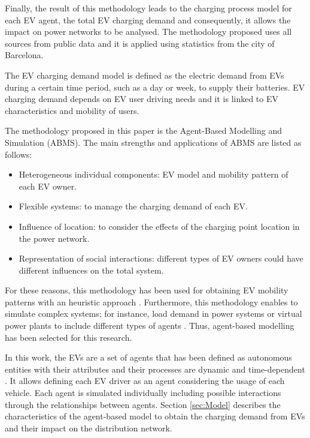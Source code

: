 \documentclass[a4paper,11pt,twoside,openright]{report}
\begin{document}
Finally, the result of this methodology leads to the charging process model for each EV agent, the total EV charging demand and consequently, it allows the impact on power networks to be analysed. The methodology proposed uses all sources from public data and it is applied using statistics from the city of Barcelona.

The EV charging demand model is defined as the electric demand from EVs during a certain time period, such as a day or week, to supply their batteries. EV charging demand depends on EV user driving needs and it is linked to EV characteristics and mobility of users.

The methodology proposed in this paper is the Agent-Based Modelling and Simulation (ABMS). The main strengths and applications of ABMS are listed as follows:

\begin{itemize}
	\item Heterogeneous individual components: EV model and mobility pattern of each EV owner.
	\item Flexible systems: to manage the charging demand of each EV.
	\item Influence of location: to consider the effects of the charging point location in the power network.
	\item Representation of social interactions: different types of EV owners could have different influences on the total system.
\end{itemize}

For these reasons, this methodology has been used for obtaining EV mobility patterns with an heuristic approach \cite{ElBanhawyABMS2012}. Furthermore, this methodology enables to simulate complex systems; for instance, load demand in power systems \cite{Acha79} or virtual power plants to include different types of agents \cite{vale2011vpp}. Thus, agent-based modelling has been selected for this research.

In this work, the EVs are a set of agents that has been defined as autonomous entities with their attributes and their processes are dynamic and time-dependent \cite{Macal,Bonabeau_AB}. It allows defining each EV driver as an agent considering the usage of each vehicle. Each agent is simulated individually including possible interactions through the relationships between agents. Section \ref{sec:Model} describes the characteristics of the agent-based model to obtain the charging demand from EVs and their impact on the distribution network.
\end{document}
